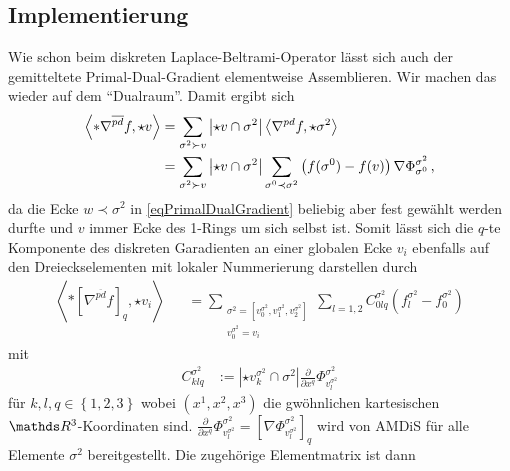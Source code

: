   \subsection{Implementierung}
    Wie schon beim diskreten Laplace-Beltrami-Operator lässt sich auch der gemitteltete Primal-Dual-Gradient elementweise Assemblieren.
    Wir machen das wieder auf dem "`Dualraum"'. 
    Damit ergibt sich
    \begin{align}
      \left\langle *\nabla^{\overline{pd}} f, \star v \right\rangle
        &= \sum_{\sigma^{2}\succ v} \left| \star v \cap \sigma^{2} \right| 
                  \left\langle \nabla^{pd} f , \star\sigma^{2} \right\rangle \\
        &= \sum_{\sigma^{2}\succ v} \left| \star v \cap \sigma^{2} \right|
                 \sum_{\sigma^{0}\prec\sigma^{2}} \left( f(\sigma^{0}) - f(v) \right) \nabla\Phi_{\sigma^{0}}^{\sigma^{2}} \,\text{,}
    \end{align}
    da die Ecke \( w \prec \sigma^{2} \) in \eqref{eqPrimalDualGradient} beliebig aber fest gewählt werden durfte 
    und \( v \) immer Ecke des 1-Rings um sich selbst ist.
    Somit lässt sich die \( q \)-te Komponente des diskreten Garadienten an einer globalen Ecke \( v_{i} \) 
    ebenfalls auf den Dreieckselementen mit lokaler Nummerierung
    darstellen durch
    \begin{align}
      \left\langle *\left[ \nabla^{\overline{pd}} f \right]_{q}, \star v_{i} \right\rangle
          &&= \sum_{\substack{\sigma^{2}=\left[ v^{\sigma^{2}}_{0},v^{\sigma^{2}}_{1},v^{\sigma^{2}}_{2} \right]\\
                                               v^{\sigma^{2}}_{0} = v_{i}}}
                  \sum_{l=1,2} C^{\sigma^{2}}_{0lq} 
                      \left( f_{l}^{\sigma^{2}} - f_{0}^{\sigma^{2}}\right)
    \end{align}
    mit
    \begin{align}
      C^{\sigma^{2}}_{klq} &:= \left| \star v_{k}^{\sigma^{2}} \cap \sigma^{2} \right|
                               \frac{\partial}{\partial x^{q}} \Phi^{\sigma^{2}}_{v_{l}^{\sigma^{2}}}
    \end{align}
    für \( k,l,q\in\left\{ 1,2,3 \right\} \) wobei \( \left( x^{1}, x^{2}, x^{3} \right) \) die gwöhnlichen kartesischen \( \R^{3} \)-Koordinaten sind.
    \( \frac{\partial}{\partial x^{q}}\Phi^{\sigma^{2}}_{v_{l}^{\sigma^{2}}} = \left[ \nabla \Phi^{\sigma^{2}}_{v_{l}^{\sigma^{2}}} \right]_{q} \)
    wird von AMDiS für alle Elemente \( \sigma^{2} \) bereitgestellt.
    Die zugehörige Elementmatrix ist dann
